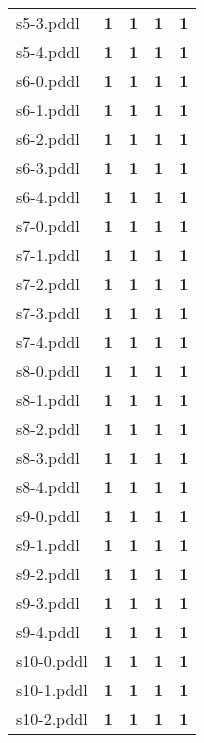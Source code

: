 \documentclass{article}
\begin{document}
\begin{tabular}{@{}lrrrr@{}}
s5-3.pddl & \textbf{1} & \textbf{1} & \textbf{1} & \textbf{1} \\
s5-4.pddl & \textbf{1} & \textbf{1} & \textbf{1} & \textbf{1} \\
s6-0.pddl & \textbf{1} & \textbf{1} & \textbf{1} & \textbf{1} \\
s6-1.pddl & \textbf{1} & \textbf{1} & \textbf{1} & \textbf{1} \\
s6-2.pddl & \textbf{1} & \textbf{1} & \textbf{1} & \textbf{1} \\
s6-3.pddl & \textbf{1} & \textbf{1} & \textbf{1} & \textbf{1} \\
s6-4.pddl & \textbf{1} & \textbf{1} & \textbf{1} & \textbf{1} \\
s7-0.pddl & \textbf{1} & \textbf{1} & \textbf{1} & \textbf{1} \\
s7-1.pddl & \textbf{1} & \textbf{1} & \textbf{1} & \textbf{1} \\
s7-2.pddl & \textbf{1} & \textbf{1} & \textbf{1} & \textbf{1} \\
s7-3.pddl & \textbf{1} & \textbf{1} & \textbf{1} & \textbf{1} \\
s7-4.pddl & \textbf{1} & \textbf{1} & \textbf{1} & \textbf{1} \\
s8-0.pddl & \textbf{1} & \textbf{1} & \textbf{1} & \textbf{1} \\
s8-1.pddl & \textbf{1} & \textbf{1} & \textbf{1} & \textbf{1} \\
s8-2.pddl & \textbf{1} & \textbf{1} & \textbf{1} & \textbf{1} \\
s8-3.pddl & \textbf{1} & \textbf{1} & \textbf{1} & \textbf{1} \\
s8-4.pddl & \textbf{1} & \textbf{1} & \textbf{1} & \textbf{1} \\
s9-0.pddl & \textbf{1} & \textbf{1} & \textbf{1} & \textbf{1} \\
s9-1.pddl & \textbf{1} & \textbf{1} & \textbf{1} & \textbf{1} \\
s9-2.pddl & \textbf{1} & \textbf{1} & \textbf{1} & \textbf{1} \\
s9-3.pddl & \textbf{1} & \textbf{1} & \textbf{1} & \textbf{1} \\
s9-4.pddl & \textbf{1} & \textbf{1} & \textbf{1} & \textbf{1} \\
s10-0.pddl & \textbf{1} & \textbf{1} & \textbf{1} & \textbf{1} \\
s10-1.pddl & \textbf{1} & \textbf{1} & \textbf{1} & \textbf{1} \\
s10-2.pddl & \textbf{1} & \textbf{1} & \textbf{1} & \textbf{1} \\

\end{tabular}
\end{document}
